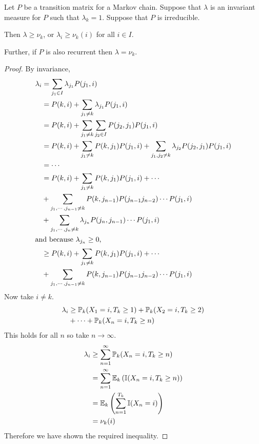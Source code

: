 \documentclass[../Main.tex]{subfiles}
\begin{document}
\begin{theorem}[$\nu_k$ is unique]
    Let $P$ be a transition matrix for a Markov chain. Suppose that $\lambda$ is an invariant measure for $P$ such that $\lambda_k = 1$. Suppose that $P$ is irreducible.

    Then $\lambda \geq \nu_k$, or $\lambda_i \geq \nu_k(i)$ for all $i \in I$.

    Further, if $P$ is also recurrent then $\lambda = \nu_k$.
    \label{thmInvMeasureUnique}
\end{theorem}
\begin{proof}
    By invariance, 
    \begin{align*}
        \lambda_i &= \sum_{j_1 \in I} \lambda_{j_1} P(j_1, i) \\
        &= P(k, i) + \sum_{j_1 \neq k} \lambda_{j_1} P(j_1, i) \\
        &= P(k, i) + \sum_{j_1 \neq k} \sum_{j_2 \in I} P(j_2, j_1) P(j_1, i) \\
        &= P(k, i) + \sum_{j_1 \neq k} P(k, j_1) P(j_1, i) + \sum_{j_1, j_2 \neq k} \lambda_{j_2} P(j_2, j_1) P(j_1, i) \\
        &= \cdots \\
        &= P(k, i) + \sum_{j_1 \neq k}P(k, j_1) P(j_1, i) + \cdots \\
        &+ \sum_{j_1, \cdots, j_{n-1} \neq k} P(k, j_{n-1}) P(j_{n-1} j_{n-2}) \cdots P(j_1, i) \\
        &+ \sum_{j_1, \cdots, j_n \neq k} \lambda_{j_n} P(j_n, j_{n-1}) \cdots P(j_1, i) \\
        \intertext{and because $\lambda_{j_n} \geq 0$,}
        &\geq P(k, i) + \sum_{j_1 \neq k}P(k, j_1) P(j_1, i) + \cdots \\
        &+ \sum_{j_1, \cdots, j_{n-1} \neq k} P(k, j_{n-1}) P(j_{n-1} j_{n-2}) \cdots P(j_1, i)
    \end{align*}
    Now take $i \neq k$.
    \begin{align*}
        \lambda_i &\geq \P_k(X_1 = i, T_k \geq 1) + \P_k(X_2 = i, T_k \geq 2) \\
        &+ \cdots + \P_k(X_n = i, T_k \geq n)
    \end{align*}
    This holds for all $n$ so take $n \to \infty$.
    \begin{align*}
        \lambda_i &\geq \sum_{n=1}^\infty \P_k(X_n = i, T_k \geq n) \\
        &= \sum_{n=1}^{\infty} \E_k \left(\ind{X_n = i, T_k \geq n}\right) \\
        &= \E_k \left(\sum_{n=1}^{T_k} \ind{X_n = i}\right) \\
        &= \nu_k(i)
    \end{align*}
    Therefore we have shown the required inequality.


\end{proof}
\end{document}
